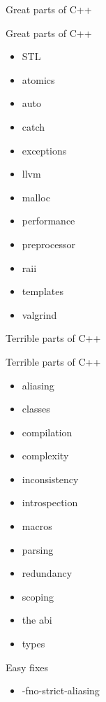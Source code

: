 \documentclass[20pt]{beamer}
\begin{document}
\begin{frame}{Great parts of C++}
\end{frame}

\begin{frame}{Great parts of C++}
  \begin{multicols}{2}
    \begin{itemize}
    \item STL
    \item atomics
    \item auto
    \item catch
    \item exceptions
    \item llvm
    \item malloc
    \item performance
    \item preprocessor
    \item raii
    \item templates
    \item valgrind
    \end{itemize}
  \end{multicols}
\end{frame}

\begin{frame}{Terrible parts of C++}
\end{frame}

\begin{frame}{Terrible parts of C++}
  \begin{multicols}{2}
    \begin{itemize}
    \item aliasing
    \item classes
    \item compilation
    \item complexity
    \item inconsistency
    \item introspection
    \item macros
    \item parsing
    \item redundancy
    \item scoping
    \item the abi
    \item types
    \end{itemize}
  \end{multicols}
\end{frame}

\begin{frame}{Easy fixes}
  \begin{itemize}
  \item -fno-strict-aliasing
  \end{itemize}
\end{frame}
\end{document}
